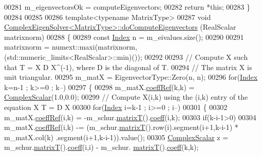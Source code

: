 \begin{DoxyCode}
00281   m\_eigenvectorsOk = computeEigenvectors;
00282   \textcolor{keywordflow}{return} *\textcolor{keyword}{this};
00283 \}
00284 
00285 
00286 \textcolor{keyword}{template}<\textcolor{keyword}{typename} MatrixType>
00287 \textcolor{keywordtype}{void} \hyperlink{group___eigenvalues___module_class_eigen_1_1_complex_eigen_solver}{ComplexEigenSolver<MatrixType>::doComputeEigenvectors}
      (RealScalar matrixnorm)
00288 \{
00289   \textcolor{keyword}{const} \hyperlink{group___eigenvalues___module_abc0218d8b902af0d6c759bfc0a8a8d74}{Index} n = m\_eivalues.size();
00290 
00291   matrixnorm = numext::maxi(matrixnorm,(std::numeric\_limits<RealScalar>::min)());
00292 
00293   \textcolor{comment}{// Compute X such that T = X D X^(-1), where D is the diagonal of T.}
00294   \textcolor{comment}{// The matrix X is unit triangular.}
00295   m\_matX = EigenvectorType::Zero(n, n);
00296   \textcolor{keywordflow}{for}(\hyperlink{group___eigenvalues___module_abc0218d8b902af0d6c759bfc0a8a8d74}{Index} k=n-1 ; k>=0 ; k--)
00297   \{
00298     m\_matX.\hyperlink{class_eigen_1_1_plain_object_base_a25626a55b26a4323565f79d1b7c48ea8}{coeffRef}(k,k) = \hyperlink{group___eigenvalues___module_a3604c99a69fac3bee42c88cb2b589143}{ComplexScalar}(1.0,0.0);
00299     \textcolor{comment}{// Compute X(i,k) using the (i,k) entry of the equation X T = D X}
00300     \textcolor{keywordflow}{for}(\hyperlink{group___eigenvalues___module_abc0218d8b902af0d6c759bfc0a8a8d74}{Index} i=k-1 ; i>=0 ; i--)
00301     \{
00302       m\_matX.\hyperlink{class_eigen_1_1_plain_object_base_a25626a55b26a4323565f79d1b7c48ea8}{coeffRef}(i,k) = -m\_schur.\hyperlink{group___eigenvalues___module_add3ab5ed83f7f2f06b79fa910a2d5684}{matrixT}().\hyperlink{class_eigen_1_1_plain_object_base_afbfc12954f16d21aedb7bd839f64a278}{coeff}(i,k);
00303       \textcolor{keywordflow}{if}(k-i-1>0)
00304         m\_matX.\hyperlink{class_eigen_1_1_plain_object_base_a25626a55b26a4323565f79d1b7c48ea8}{coeffRef}(i,k) -= (m\_schur.\hyperlink{group___eigenvalues___module_add3ab5ed83f7f2f06b79fa910a2d5684}{matrixT}().row(i).segment(i+1,k-i-1) * m\_matX.col(k)
      .segment(i+1,k-i-1)).value();
00305       \hyperlink{group___eigenvalues___module_a3604c99a69fac3bee42c88cb2b589143}{ComplexScalar} z = m\_schur.\hyperlink{group___eigenvalues___module_add3ab5ed83f7f2f06b79fa910a2d5684}{matrixT}().\hyperlink{class_eigen_1_1_plain_object_base_afbfc12954f16d21aedb7bd839f64a278}{coeff}(i,i) - m\_schur.
      \hyperlink{group___eigenvalues___module_add3ab5ed83f7f2f06b79fa910a2d5684}{matrixT}().\hyperlink{class_eigen_1_1_plain_object_base_afbfc12954f16d21aedb7bd839f64a278}{coeff}(k,k);

\end{DoxyCode}
